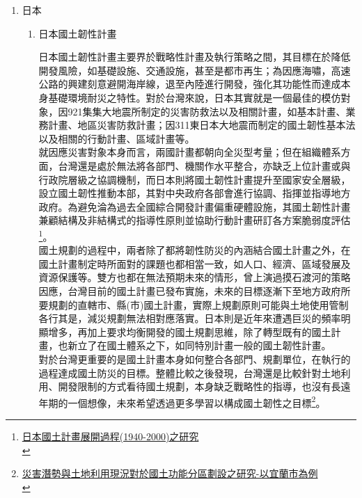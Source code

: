 \documentclass[a4paper,12pt]{article}
\begin{document}
\begin{enumerate}
\item 日本
\label{sec:org8341d3d}

\begin{enumerate}
\item 日本國土韌性計畫
\label{sec:orgeee6afc}

日本國土韌性計畫主要界於戰略性計畫及執行策略之間，其目標在於降低開發風險，如基礎設施、交通設施，甚至是都市再生；為因應海嘯，高速公路的興建刻意避開海岸線，退至內陸進行開發，強化其功能性而達成本身基礎環境耐災之特性。對於台灣來說，日本其實就是一個最佳的模仿對象，因921集集大地震所制定的災害防救法以及相關計畫，如基本計畫、業務計畫、地區災害防救計畫；因311東日本大地震而制定的國土韌性基本法以及相關的行動計畫、區域計畫等。\\

就因應災害對象本身而言，兩國計畫都朝向全災型考量；但在組織體系方面，台灣還是處於無法將各部門、機關作水平整合，亦缺乏上位計畫或與行政院層級之協調機制，而日本則將國土韌性計畫提升至國家安全層級，設立國土韌性推動本部，其對中央政府各部會進行協調、指揮並指導地方政府。為避免淪為過去全國綜合開發計畫偏重硬體設施，其國土韌性計畫兼顧結構及非結構式的指導性原則並協助行動計畫研訂各方案脆弱度評估\footnote{\href{https://www.google.com/url?sa=t\&rct=j\&q=\&esrc=s\&source=web\&cd=\&ved=2ahUKEwjB8anqhMPvAhXQEqYKHeduCgYQFjAAegQIBhAD\&url=http\%3A\%2F\%2Feportfolio.lib.ksu.edu.tw\%2Fuser\%2F4\%2F9\%2F4970T113\%2Frepository\%2FA2-2.pdf\&usg=AOvVaw2Q5Exe9XHwDJNSuRuVsXQD}{日本國土計畫展開過程(1940-2000)之研究}\\}。\\

國土規劃的過程中，兩者除了都將韌性防災的內涵結合國土計畫之外，在國土計畫制定時所面對的課題也都相當一致，如人口、經濟、區域發展及資源保護等。雙方也都在無法預期未來的情形，曾上演過摸石渡河的策略因應，台灣目前的國土計畫已發布實施，未來的目標逐漸下至地方政府所要規劃的直轄市、縣(市)國土計畫，實際上規劃原則可能與土地使用管制各行其是，減災規劃無法相對應落實。日本則是近年來遭遇巨災的頻率明顯增多，再加上要求均衡開發的國土規劃思維，除了轉型既有的國土計畫，也新立了在國土體系之下，如同特別計畫一般的國土韌性計畫。\\

對於台灣更重要的是國土計畫本身如何整合各部門、規劃單位，在執行的過程達成國土防災的目標。整體比較之後發現，台灣還是比較針對土地利用、開發限制的方式看待國土規劃，本身缺乏戰略性的指導，也沒有長遠年期的一個想像，未來希望透過更多學習以構成國土韌性之目標\footnote{\href{https://ndltd.ncl.edu.tw/cgi-bin/gs32/gsweb.cgi/login?o=dnclcdr\&s=id=\%22108MCU00653005\%22.\&searchmode=basic}{災害潛勢與土地利用現況對於國土功能分區劃設之研究-以宜蘭市為例}\\}。\\


\end{enumerate}
\end{enumerate}
\end{document}
